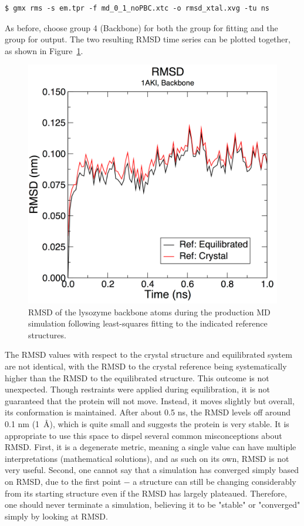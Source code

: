 \documentclass[9pt,tutorial,pubversion]{livecoms}
\begin{document}
\begin{lstlisting}
$ gmx rms -s em.tpr -f md_0_1_noPBC.xtc -o rmsd_xtal.xvg -tu ns
\end{lstlisting}

As before, choose group 4 (Backbone) for both the group for fitting and the group for output. The two resulting RMSD time series can be plotted together, as shown in Figure~\ref{lyso_md_rmsd_fig}.

\begin{figure}[h]
\centering
\includegraphics{plot_lyso_md_rmsd}
\caption{RMSD of the lysozyme backbone atoms during the production MD simulation following least-squares fitting to the indicated reference structures.}
\label{lyso_md_rmsd_fig}
\end{figure}

The RMSD values with respect to the crystal structure and equilibrated system are not identical, with the RMSD to the crystal reference being systematically higher than the RMSD to the equilibrated structure. This outcome is not unexpected. Though restraints were applied during equilibration, it is not guaranteed that the protein will not move. Instead, it moves slightly but overall, its conformation is maintained. After about 0.5 ns, the RMSD levels off around 0.1 nm (1~\AA), which is quite small and suggests the protein is very stable. It is appropriate to use this space to dispel several common misconceptions about RMSD. First, it is a degenerate metric, meaning a single value can have multiple interpretations (mathematical solutions), and as such on its own, RMSD is not very useful. Second, one cannot say that a simulation has converged simply based on RMSD, due to the first point $-$ a structure can still be changing considerably from its starting structure even if the RMSD has largely plateaued. Therefore, one should never terminate a simulation, believing it to be "stable" or "converged" simply by looking at RMSD.
\end{document}
